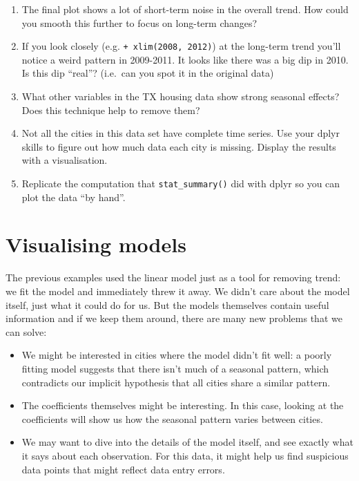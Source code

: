 \begin{enumerate}
\def\labelenumi{\arabic{enumi}.}
\item
  The final plot shows a lot of short-term noise in the overall trend.
  How could you smooth this further to focus on long-term changes?
\item
  If you look closely (e.g. \texttt{+\ xlim(2008,\ 2012)}) at the
  long-term trend you'll notice a weird pattern in 2009-2011. It looks
  like there was a big dip in 2010. Is this dip ``real''? (i.e.~can you
  spot it in the original data)
\item
  What other variables in the TX housing data show strong seasonal
  effects? Does this technique help to remove them?
\item
  Not all the cities in this data set have complete time series. Use
  your dplyr skills to figure out how much data each city is missing.
  Display the results with a visualisation.
\item
  Replicate the computation that \texttt{stat\_summary()} did with dplyr
  so you can plot the data ``by hand''.
\end{enumerate}

\hypertarget{sub:modelvis}{%
\section{Visualising models}\label{sub:modelvis}}

The previous examples used the linear model just as a tool for removing
trend: we fit the model and immediately threw it away. We didn't care
about the model itself, just what it could do for us. But the models
themselves contain useful information and if we keep them around, there
are many new problems that we can solve:

\begin{itemize}
\item
  We might be interested in cities where the model didn't fit well: a
  poorly fitting model suggests that there isn't much of a seasonal
  pattern, which contradicts our implicit hypothesis that all cities
  share a similar pattern.
\item
  The coefficients themselves might be interesting. In this case,
  looking at the coefficients will show us how the seasonal pattern
  varies between cities.
\item
  We may want to dive into the details of the model itself, and see
  exactly what it says about each observation. For this data, it might
  help us find suspicious data points that might reflect data entry
  errors.
\end{itemize}

